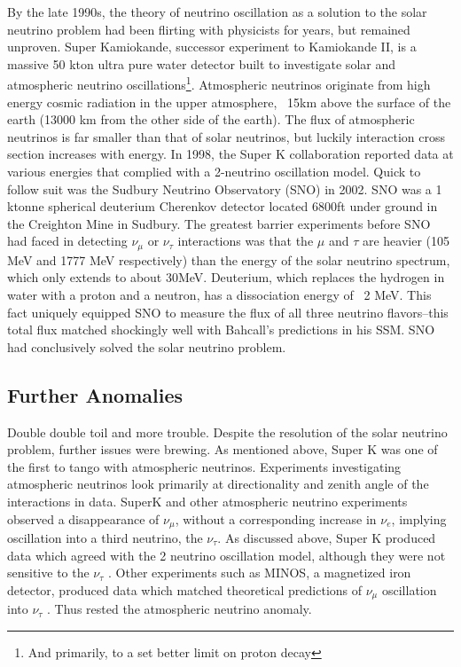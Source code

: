 \documentclass[12pt]{article}
\begin{document}
\par By the late 1990s, the theory of neutrino oscillation as a solution to the solar neutrino problem had been flirting with physicists for years, but remained unproven.  Super Kamiokande, successor experiment to Kamiokande II, is a massive 50 kton ultra pure water detector built to investigate solar and atmospheric neutrino oscillations\footnote{And primarily, to a set better limit on proton decay}.  Atmospheric neutrinos originate from high energy cosmic radiation in the upper atmosphere, ~15km above the surface of the earth (13000 km from the other side of the earth). The flux of atmospheric neutrinos is far smaller than that of solar neutrinos, but luckily interaction cross section increases with energy. In 1998, the Super K collaboration reported data at various energies that complied with a 2-neutrino oscillation model\cite{superk}.
Quick to follow suit was the Sudbury Neutrino Observatory (SNO) in 2002.  SNO was a 1 ktonne spherical deuterium Cherenkov detector located 6800ft under ground in the Creighton Mine in Sudbury\cite{sno}. The greatest barrier experiments before SNO had faced in detecting $\nu_\mu$ or $\nu_\tau$ interactions was that the $\mu$ and $\tau$ are heavier (105 MeV and 1777 MeV respectively) than the energy of the solar neutrino spectrum, which only extends to about 30MeV. Deuterium, which replaces the hydrogen in water with a proton and a neutron, has a dissociation energy of ~2 MeV. This fact uniquely equipped SNO to measure the flux of all three neutrino flavors\cite{sno}--this total flux matched shockingly well with Bahcall's predictions in his SSM. SNO had conclusively solved the solar neutrino problem.  
\subsection{Further Anomalies}
Double double toil and more trouble. Despite the resolution of the solar neutrino problem, further issues were brewing. As mentioned above, Super K was one of the first to tango with atmospheric neutrinos.  Experiments investigating atmospheric neutrinos look primarily at directionality and zenith angle of the interactions in data. SuperK and other atmospheric neutrino experiments observed a disappearance of $\nu_\mu$, without a corresponding increase in $\nu_e$, implying oscillation into a third neutrino, the $\nu_\tau$. As discussed above, Super K produced data which agreed with the 2 neutrino oscillation model, although they were not sensitive to the $\nu_\tau$ \cite{superk}. Other experiments such as MINOS, a magnetized iron detector, produced data which matched theoretical predictions of $\nu_\mu$ oscillation into $\nu_\tau$ \cite{minos}. Thus rested the atmospheric neutrino anomaly.
\end{document}
